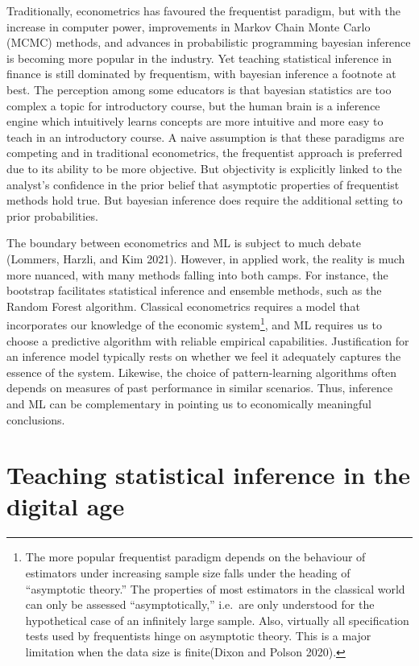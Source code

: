 \documentclass{article}
\begin{document}
Traditionally, econometrics has favoured the frequentist paradigm, but
with the increase in computer power, improvements in Markov Chain Monte
Carlo (MCMC) methods, and advances in probabilistic programming bayesian
inference is becoming more popular in the industry. Yet teaching
statistical inference in finance is still dominated by frequentism, with
bayesian inference a footnote at best. The perception among some
educators is that bayesian statistics are too complex a topic for
introductory course, but the human brain is a inference engine which
intuitively learns concepts are more intuitive and more easy to teach in
an introductory course. A naive assumption is that these paradigms are
competing and in traditional econometrics, the frequentist approach is
preferred due to its ability to be more objective. But objectivity is
explicitly linked to the analyst's confidence in the prior belief that
asymptotic properties of frequentist methods hold true. But bayesian
inference does require the additional setting to prior probabilities.

The boundary between econometrics and ML is subject to much debate
(Lommers, Harzli, and Kim 2021). However, in applied work, the reality
is much more nuanced, with many methods falling into both camps. For
instance, the bootstrap facilitates statistical inference and ensemble
methods, such as the Random Forest algorithm. Classical econometrics
requires a model that incorporates our knowledge of the economic
system\footnote{The more popular frequentist paradigm depends on the
  behaviour of estimators under increasing sample size falls under the
  heading of ``asymptotic theory.'' The properties of most estimators in
  the classical world can only be assessed ``asymptotically,'' i.e.~are
  only understood for the hypothetical case of an infinitely large
  sample. Also, virtually all specification tests used by frequentists
  hinge on asymptotic theory. This is a major limitation when the data
  size is finite(Dixon and Polson 2020).}, and ML requires us to choose
a predictive algorithm with reliable empirical capabilities.
Justification for an inference model typically rests on whether we feel
it adequately captures the essence of the system. Likewise, the choice
of pattern-learning algorithms often depends on measures of past
performance in similar scenarios. Thus, inference and ML can be
complementary in pointing us to economically meaningful conclusions.

\hypertarget{teaching-statistical-inference-in-the-digital-age}{%
\section{Teaching statistical inference in the digital
age}\label{teaching-statistical-inference-in-the-digital-age}}
\end{document}
